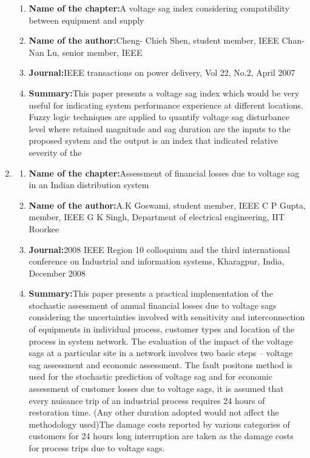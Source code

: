 \documentclass[14pt, a4paper]{extreport}
\begin{document}
\begin{enumerate}
\begin{enumerate}
        \item{\textbf{Name of the chapter:}}A voltage sag
index
considering
compatibility
between
equipment and
supply
\item{\textbf{Name of the author:}}Cheng- Chieh
Shen, student
member, IEEE
Chan-Nan Lu,
senior member,
IEEE
\item{\textbf{Journal:}}IEEE
transactions
on power
delivery, Vol
22, No.2,
April 2007
\item{\textbf{Summary:}}This paper presents a
voltage sag index which
would be very useful for
indicating system
performance experience at
different locations. Fuzzy
logic techniques are
applied to quantify
voltage sag disturbance
level where retained
magnitude and sag
duration are the inputs to
the proposed system and
the output is an index
that indicated relative
severity of the
\end{enumerate}
\item \begin{enumerate}
\item{\textbf{Name of the chapter:}}Assessment of
financial losses
due to voltage
sag in an Indian
distribution
system
\item{\textbf{Name of the author:}}A.K Goswami,
student
member, IEEE
C P Gupta,
member, IEEE
G K Singh,
Department of
electrical
engineering,
IIT Roorkee
\item{\textbf{Journal:}}2008 IEEE
Region 10
colloquium
and the third
international
conference on
Industrial and
information
systems,
Kharagpur,
India,
December
2008
\item{\textbf{Summary:}}This paper presents a
practical implementation
of the stochastic
assessment of annual
financial losses due to
voltage sags considering
the uncertainties involved
with sensitivity and
interconnection of
equipments in individual
process, customer types
and location of the
process in system
network. The evaluation
of the impact of the
voltage sags at a
particular site in a
network involves two
basic steps – voltage sag
assessment and economic
assessment. The fault
positons method is used
for the stochastic
prediction of voltage sag
and for economic
assessment of customer
losses due to voltage sags,
it is assumed that every
nuisance trip of an
industrial process requires
24 hours of restoration
time. (Any other duration
adopted would not affect
the methodology used)The damage costs
reported by various
categories of customers
for 24 hours long
interruption are taken as
the damage costs for
process trips due to
voltage sags.


\end{enumerate}
\end{enumerate}
\end{document}
